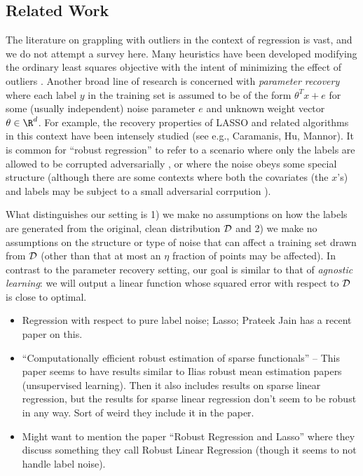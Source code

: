 \subsection{Related Work}

The literature on grappling with outliers in the context of regression is vast, and we do not attempt a survey here.  Many heuristics have been developed modifying the ordinary least squares objective with the intent of minimizing the effect of outliers \cite{RousseeuwLeroy}.  Another broad line of research is concerned with {\em parameter recovery} where each label $y$ in the training set is assumed to be of the form $\theta^{T} x + e$ for some (usually independent) noise parameter $e$ and unknown weight vector $\theta \in \R^d$.  For example, the recovery properties of LASSO and related algorithms in this context have been intensely studied (see e.g., Caramanis, Hu, Mannor).  It is common for ``robust regression'' to refer to a scenario where only the labels are allowed to be corrupted adversarially \cite{PrateekJain}, or where the noise obeys some special structure \cite{} (although there are some contexts where both the covariates (the $x$'s) and labels may be subject to a small adversarial corrpution \cite{Chen,Caramanis,Hu}). 

What distinguishes our setting is 1) we make no assumptions on how the labels are generated from the original, clean distribution ${\cal D}$ and 2) we make no assumptions on the structure or type of noise that can affect a training set drawn from ${\cal D}$ (other than that at most an $\eta$ fraction of points may be affected).  In contrast to the parameter recovery setting, our goal is similar to that of {\em agnostic learning}: we will output a linear function whose squared error with respect to ${\cal D}$ is close to optimal.    



\begin{itemize}

\item Regression with respect to pure label noise; Lasso; Prateek Jain
  has a recent paper on this. 

\item ``Computationally efficient robust estimation of sparse
  functionals'' -- This paper seems to have results similar to Ilias
  robust mean estimation papers (unsupervised learning).  Then it also
  includes results on sparse linear regression, but the results for
  sparse linear regression don't seem to be robust in any way. Sort of
  weird they include it in the paper.

\item Might want to mention the paper ``Robust Regression and Lasso''
  where they discuss something they call Robust Linear Regression
  (though it seems to not handle label noise). 

\end{itemize}

